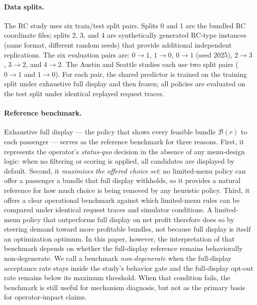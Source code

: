 \paragraph{Data splits.} The RC study uses six train/test split pairs. Splits 0 and 1 are the bundled RC coordinate files; splits 2, 3, and 4 are synthetically generated RC-type instances (same format, different random seeds) that provide additional independent replications. The six evaluation pairs are: $0{\to}1$, $1{\to}0$, $0{\to}1$ (seed 2025), $2{\to}3$, $3{\to}2$, and $4{\to}2$. The Austin and Seattle studies each use two split pairs ($0{\to}1$ and $1{\to}0$). For each pair, the shared predictor is trained on the training split under exhaustive full display and then frozen; all policies are evaluated on the test split under identical replayed request traces.

\paragraph{Reference benchmark.} Exhaustive full display --- the policy that shows every feasible bundle $\mathcal{B}(r)$ to each passenger --- serves as the reference benchmark for three reasons. First, it represents the operator's \emph{status-quo} decision in the absence of any menu-design logic: when no filtering or scoring is applied, all candidates are displayed by default. Second, it \emph{maximizes the offered choice set}: no limited-menu policy can offer a passenger a bundle that full display withholds, so it provides a natural reference for how much choice is being removed by any heuristic policy. Third, it offers a clear operational benchmark against which limited-menu rules can be compared under identical request traces and simulator conditions. A limited-menu policy that outperforms full display on net profit therefore does so by steering demand toward more profitable bundles, not because full display is itself an optimization optimum. In this paper, however, the interpretation of that benchmark depends on whether the full-display reference remains behaviorally non-degenerate. We call a benchmark \emph{non-degenerate} when the full-display acceptance rate stays inside the study's behavior gate and the full-display opt-out rate remains below its maximum threshold. When that condition fails, the benchmark is still useful for mechanism diagnosis, but not as the primary basis for operator-impact claims.

